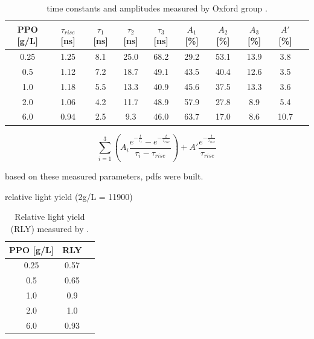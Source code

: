 \begin{table}[ht]
	\centering
	\caption{\label{oxfordMeasure} time constants and amplitudes measured by Oxford group \cite{oxfordMeasurement}.}	
	{\centering
		\begin{tabular*}{160mm}{c@{\extracolsep{\fill}}ccccccccc}
			\toprule 
			PPO [g/L] & $\tau_{rise}$ [ns] & $\tau_1$ [ns] & $\tau_2$ [ns] & $\tau_3$ [ns] & $A_1$ [\%]  & $A_2$ [\%]   & $A_3$ [\%]  & $A'$ [\%] \\
			\midrule
		 0.25 & 1.25 & 8.1 & 25.0 & 68.2 & 29.2 & 53.1 & 13.9 & 3.8\\
		 0.5  & 1.12 & 7.2 & 18.7 & 49.1 & 43.5 & 40.4 & 12.6 & 3.5 \\
		 1.0 & 1.18 & 5.5 & 13.3 & 40.9 &	45.6 & 37.5 & 13.3 & 3.6 \\
		 2.0 & 1.06 & 4.2 & 11.7 & 48.9 & 57.9 & 27.8 & 8.9 & 5.4	\\
		 6.0 & 0.94 & 2.5 & 9.3  & 46.0 & 63.7 & 17.0 & 8.6 & 10.7\\
			\bottomrule	
		\end{tabular*}
	}
\end{table}


\[
\sum_{i=1}^3 (A_i\frac{e^{-\frac{t}{\tau_i}}-e^{-\frac{t}{\tau_{rise}}}}{\tau_i-\tau_{rise}})+A'\frac{e^{-\frac{t}{\tau_{rise}}}}{\tau_{rise}}
\]

based on these measured parameters, pdfs were built. 



relative light yield (2g/L = 11900)
\begin{table}[ht]
	\centering
	\caption{\label{oxfordMeasure2}Relative light yield (RLY) measured by \cite{oxfordMeasurement}.}	
	{\centering
		\begin{tabular*}{60mm}{c@{\extracolsep{\fill}}cc}
			\toprule 
			PPO [g/L] & RLY \\
			\midrule
			0.25 & 0.57\\
			0.5 & 0.65\\
			1.0 & 0.9\\
			2.0 & 1.0\\
			6.0 & 0.93\\
			\bottomrule	
		\end{tabular*}
	}
\end{table}

